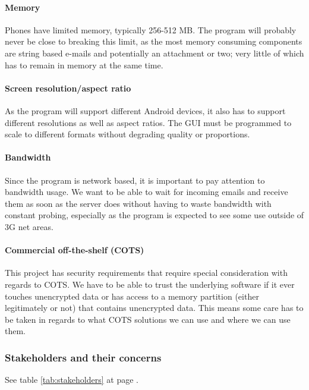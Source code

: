 \paragraph{Memory}\hfill
\newline
Phones have limited memory, typically 256-512 MB. The program will probably never be close to breaking this limit, as the most memory consuming components are string based e-mails and potentially an attachment or two; very little of which has to remain in memory at the same time.

\paragraph{Screen resolution/aspect ratio} \hfill
\newline
As the program will support different Android devices, it also has to support different resolutions as well as aspect ratios. The GUI must be programmed to scale to different formats without degrading quality or proportions.

\paragraph{Bandwidth} \hfill
\newline
Since the program is network based, it is important to pay attention to bandwidth usage. We want to be able to wait for incoming emails and receive them as soon as the server does without having to waste bandwidth with constant probing, especially as the program is expected to see some use outside of 3G net areas.

\paragraph{Commercial off-the-shelf (COTS)} \hfill
\newline
This project has security requirements that require special consideration with regards to COTS. We have to be able to trust the underlying software if it ever touches unencrypted data or has access to a memory partition (either legitimately or not) that contains unencrypted data. This means some care has to be taken in regards to what COTS solutions we can use and where we can use them. 

\subsubsection{Stakeholders and their concerns}
See table \ref{tab:stakeholders} at page \pageref{tab:stakeholders}.

